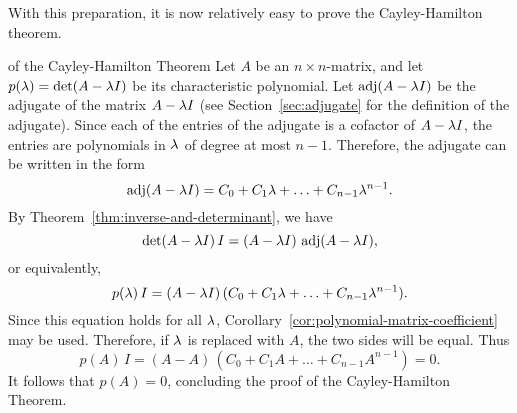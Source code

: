 With this preparation, it is now relatively easy to prove the
Cayley-Hamilton theorem.

\begin{proofof}{of the Cayley-Hamilton Theorem} Let $A$ be an
  $n\times n$-matrix, and let $p(\lambda)=\det(A-\lambda I)$ be
  its characteristic polynomial.  Let $\adj(A-\eigenvar I)$ be the
  adjugate of the matrix $A-\lambda I$ (see
  Section~\ref{sec:adjugate} for the definition of the
  adjugate). Since each of the entries of the adjugate is a cofactor
  of $A-\lambda I$, the entries are polynomials in $\lambda$ of
  degree at most $n-1$. Therefore, the adjugate can be written in the
  form
  \begin{equation*}
    \adj(A-\eigenvar I) = C_0 + C_1\eigenvar + \ldots + C_{n-1}\eigenvar^{n-1}.
  \end{equation*}
  By Theorem~\ref{thm:inverse-and-determinant}, we have
  \begin{equation*}
    \det(A-\eigenvar I)\,I = (A-\eigenvar I) \, \adj(A-\eigenvar I),
  \end{equation*}
  or equivalently,
  \begin{equation*}
    p(\lambda)\,I = 
    (A-\lambda I)\,(C_0 + C_1\lambda + \ldots + C_{n-1}\lambda^{n-1}).
  \end{equation*}
  Since this equation holds for all $\lambda$,
  Corollary~\ref{cor:polynomial-matrix-coefficient} may be
  used. Therefore, if $\lambda$ is replaced with $A$, the two sides
  will be equal. Thus
  \begin{equation*}
    p(A)\,I = (A-A)\,(C_0 + C_1A + \ldots + C_{n-1}A^{n-1}) = 0.
  \end{equation*}
  It follows that $p(A)=0$, concluding the proof of the
  Cayley-Hamilton Theorem.
\end{proofof}
